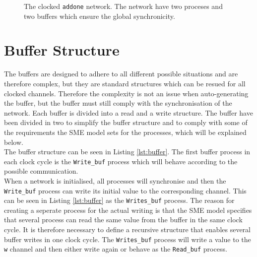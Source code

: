 \begin{figure}
\centering
{}
\caption{The clocked \texttt{addone} network. The network have two proceses and two buffers which ensure the global synchronicity.}
\label{fig:addone_clocked}
\end{figure}
\section{Buffer Structure}
The buffers are designed to adhere to all different possible situations and are therefore complex, but they are standard structures which can be resued for all clocked channels. Therefore the complexity is not an issue when auto-generating the buffer, but the buffer must still comply with the synchronisation of the network.
Each buffer is divided into a read and a write structure. The buffer have been divided in two to simplify the buffer structure and to comply with some of the requirements the SME model sets for the processes, which will be explained below. \\

The buffer structure can be seen in Listing \ref{lst:buffer}. The first buffer process in each clock cycle is the \texttt{Write\_buf} process which will behave according to the possible communication.\\

When a network is initialised, all processes will synchronise and then the \texttt{Write\_buf} process can write its initial value to the corresponding channel. This can be seen in Listing \ref{lst:buffer} as the \texttt{Writes\_buf} process. The reason for creating a seperate process for the actual writing is that the SME model specifies that several process can read the same value from the buffer in the same clock cycle. It is therefore necessary to define a recursive structure that enables several buffer writes in one clock cycle. The \texttt{Writes\_buf} process will write a value to the \texttt{w} channel and then either write again or behave as the \texttt{Read\_buf} process.\\

